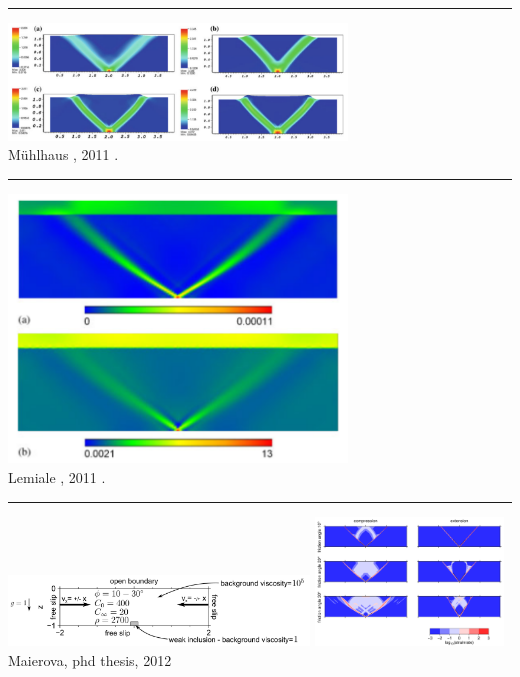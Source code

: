 \begin{center}\noindent\rule{12cm}{0.4pt}\end{center}

\begin{center}
\includegraphics[width=9cm]{images/benchmark_brick/muso11}\\
{\captionfont M{\"u}hlhaus \etal, 2011 \cite{muso11}.}
\end{center}

\begin{center}\noindent\rule{12cm}{0.4pt}\end{center}

\begin{center}
\includegraphics[width=9cm]{images/benchmark_brick/lemm11}\\
{\captionfont Lemiale \etal, 2011 \cite{lemm11}.}
\end{center}

\begin{center}\noindent\rule{12cm}{0.4pt}\end{center}

\begin{center}
\includegraphics[width=8cm]{images/benchmark_brick/maie12a}
\includegraphics[width=5cm]{images/benchmark_brick/maie12b}\\
{\captionfont Maierova, phd thesis, 2012 \cite{maie12}}
\end{center}

